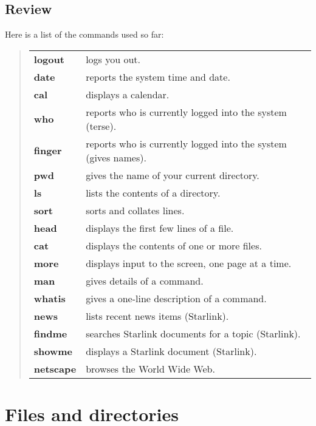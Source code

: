 \documentclass[twoside,11pt,nolof]{starlink}
\begin{document}
\newpage

\subsection{Review}

Here is a list of the commands used so far:

\begin{quote}
\begin{tabular}{lp{67mm}}

\textbf{logout}  & logs you out.\\
\textbf{date} & reports the system time and date.\\
\textbf{cal}  & displays a calendar.\\
\textbf{who}  & reports who is currently logged into the system (terse).\\
\textbf{finger}  & reports who is currently logged into the system
  (gives names).\\
\textbf{pwd}  & gives the name of your current directory.\\
\textbf{ls}   & lists the contents of a directory.\\
\textbf{sort} & sorts and collates lines.\\
\textbf{head} & displays the first few lines of a file.\\
\textbf{cat}  & displays the contents of one or more files.\\
\textbf{more} & displays input to the screen, one page at a time.\\
\textbf{man}  & gives details of a command.\\
\textbf{whatis}  & gives a one-line description of a command.\\
\textbf{news} & lists recent news items (Starlink).\\
\textbf{findme} & searches Starlink documents for a topic (Starlink).\\
\textbf{showme} & displays a Starlink document (Starlink).\\
\textbf{netscape} & browses the World Wide Web.

\end{tabular}
\end{quote}

\newpage

\section{Files and directories}
\end{document}
